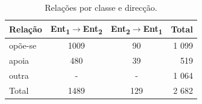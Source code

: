 \documentclass[a4paper, twocolumn, 11pt, twoside]{article}
\begin{document}
\begin{table}[!h]
    \begin{center}
    \begin{tabular}{l ccr}
        {\bf Relação} & {\bf \footnotesize{Ent\textsubscript{1}$\rightarrow$Ent\textsubscript{2}}} & {\bf \footnotesize{Ent\textsubscript{2}$\rightarrow$Ent\textsubscript{1}}} & {\bf Total} \\
        \hline
        opõe-se          &  1009  &  90  & 1 099  \\
        apoia            &  480   &  39  &   519  \\
        outra            &  -     &  -   & 1 064  \\
		\hline
		Total			 &  1489  &  129 & 2 682  \\
    \end{tabular}
	\caption{Relações por classe e direcção.}
	\label{tab:rel_dataset}
	\end{center}
\end{table}

\end{document}
